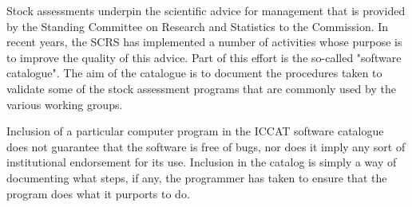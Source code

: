 \documentclass[a4paper,10pt]{article}
\title{}
\author{}
\date{}
\begin{document}
\maketitle



Stock assessments underpin the scientific advice for management that is provided by the Standing Committee on Research 
and Statistics to the Commission. In recent years, the SCRS has implemented a number of activities whose purpose is 
to improve the quality of this advice. 
Part of this effort is the so-called "software catalogue". The aim of the catalogue is to document the procedures 
taken to validate some of the stock assessment programs that are commonly used by the various working groups.

Inclusion of a particular computer program in the ICCAT software catalogue does not guarantee that the software is 
free of bugs, nor does it imply any sort of institutional endorsement for its use. Inclusion in the catalog is simply 
a way of documenting what steps, if any, the programmer has taken to ensure that the program does what it purports to do. 
\end{document}
